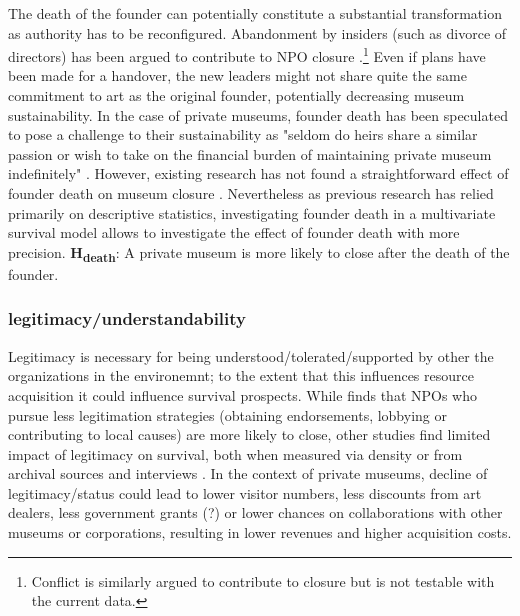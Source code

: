 \documentclass[11pt]{article}
\begin{document}
The death of the founder can potentially constitute a substantial transformation as authority has to be reconfigured.
Abandonment by insiders (such as divorce of directors) has been argued to contribute to NPO closure \parencite{Duckles_Hager_Galaskiewicz_2005_close}.\footnote{Conflict is similarly argued to contribute to closure but is not testable with the current data.}
Even if plans have been made for a handover, the new leaders might not share quite the same commitment to art as the original founder, potentially decreasing museum sustainability. 
In the case of private museums, founder death has been speculated to pose a challenge to their sustainability as "seldom do heirs share a similar passion or wish to take on the financial burden of maintaining private museum indefinitely" \parencite[p.234]{Walker_2019_collector}.
However, existing research has not found a straightforward effect of founder death on museum closure \parencite{Velthuis_Gera_forthcoming_fragility,Velthuis_etal_2023_boom}.
Nevertheless as previous research has relied primarily on descriptive statistics, investigating founder death in a multivariate survival model allows to investigate the effect of founder death with more precision.
\bigbreak
\noindent
\textbf{H\textsubscript{death}}: A private museum is more likely to close after the death of the founder.


\subsubsection*{legitimacy/understandability}

Legitimacy is necessary for being understood/tolerated/supported by other the organizations in the environemnt; to the extent that this influences resource acquisition it could influence survival prospects.
While \textcite{Bielefeld_1994_survival} finds that NPOs who pursue less legitimation strategies (obtaining endorsements, lobbying or contributing to local causes) are more likely to close, other studies find limited impact of legitimacy on survival, both when measured via density \parencite{Bogaert_etal_2014_ecological} or from archival sources and interviews \parencite{Fernandez_2007_dissolution}.
In the context of private museums, decline of legitimacy/status could lead to lower visitor numbers, less discounts from art dealers, less government grants (?) or lower chances on collaborations with other museums or corporations, resulting in lower revenues and higher acquisition costs.
\end{document}
